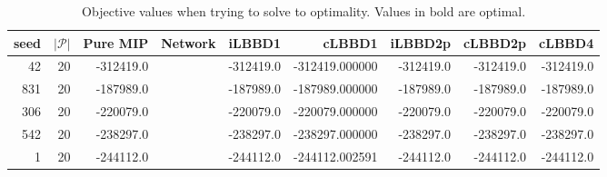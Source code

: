 \begin{table*}
    \centering
    \caption{Objective values when trying to solve to optimality. Values in bold are optimal.}
    \begin{tabular}{rrrrrrrrr} \toprule
        seed & $|\mathcal{P}|$ & Pure MIP & Network & iLBBD1 & cLBBD1 & iLBBD2p & cLBBD2p & cLBBD4 \\\midrule
  42      &      20         & -312419.0 &         & -312419.0 &-312419.000000 & -312419.0 & -312419.0 & -312419.0 \\
 831      &      20         & -187989.0  &        &-187989.0 & -187989.000000 & -187989.0 & -187989.0 &-187989.0 \\
  306      &      20       & -220079.0 &           &-220079.0 & -220079.000000 & -220079.0 & -220079.0 & -220079.0 \\
 542       &     20        & -238297.0 &          &-238297.0 & -238297.000000 & -238297.0 & -238297.0 & -238297.0 \\
    1      &      20       & -244112.0 &          &-244112.0 & -244112.002591 & -244112.0  & -244112.0 & -244112.0 \\
        \bottomrule
    \end{tabular}
\end{table*}
